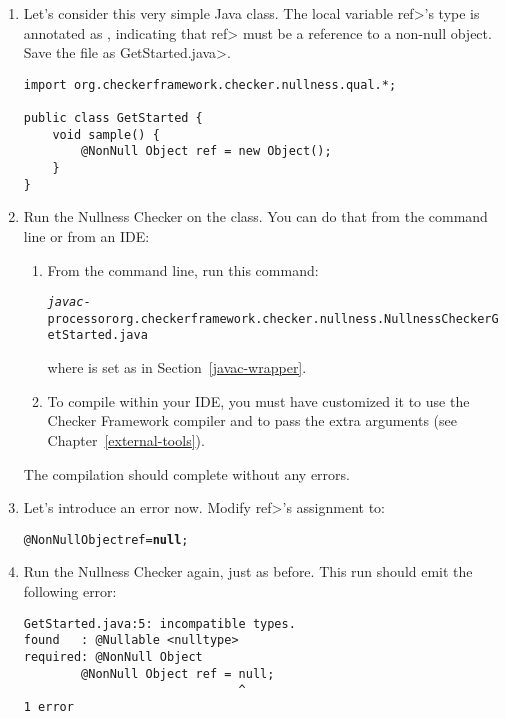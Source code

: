 \begin{enumerate}
\item
  Let's consider this very simple Java class.  The local variable \<ref>'s type is
  annotated as , indicating that \<ref> must be a reference to a
  non-null object.  Save the file as \<GetStarted.java>.

\begin{Verbatim}
import org.checkerframework.checker.nullness.qual.*;

public class GetStarted {
    void sample() {
        @NonNull Object ref = new Object();
    }
}
\end{Verbatim}

\item
  Run the Nullness Checker on the class.
  You can do that from the command line or from an IDE:

\begin{enumerate}
\item
  From the command line, run this command:

\begin{smaller}
\begin{alltt}
  \emph{javac} -processor org.checkerframework.checker.nullness.NullnessChecker GetStarted.java
\end{alltt}
\end{smaller}

\noindent
where \emph{} is set as in Section~\ref{javac-wrapper}.

\item
  To compile within your IDE, you must have customized it to use the
  Checker Framework compiler and to pass the extra arguments (see
  Chapter~\ref{external-tools}).
\end{enumerate}

  The compilation should complete without any errors.

\item
  Let's introduce an error now.  Modify \<ref>'s assignment to:
\begin{alltt}
  @NonNull Object ref = \textbf{null};
\end{alltt}

\item
  Run the Nullness Checker again, just as before.  This run should emit
  the following error:
\begin{Verbatim}
GetStarted.java:5: incompatible types.
found   : @Nullable <nulltype>
required: @NonNull Object
        @NonNull Object ref = null;
                              ^
1 error
\end{Verbatim}

\end{enumerate}


